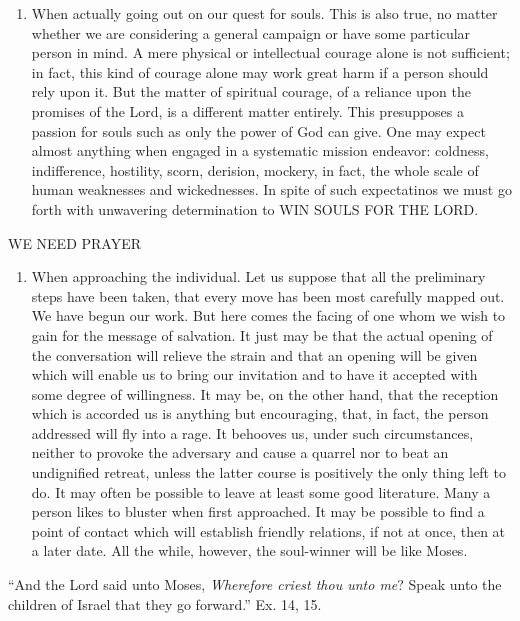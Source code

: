 \documentclass[
]{book}
\providecommand{\tightlist}{%
  \setlength{\itemsep}{0pt}\setlength{\parskip}{0pt}}
\begin{document}
\begin{enumerate}
\def\labelenumi{\alph{enumi}.}
\setcounter{enumi}{2}
\tightlist
\item
  When actually going out on our quest for souls. This is also true, no matter whether we are considering a general campaign or have some particular person in mind. A mere physical or intellectual courage alone is not sufficient; in fact, this kind of courage alone may work great harm if a person should rely upon it. But the matter of spiritual courage, of a reliance upon the promises of the Lord, is a different matter entirely. This presupposes a passion for souls such as only the power of God can give. One may expect almost anything when engaged in a systematic mission endeavor: coldness, indifference, hostility, scorn, derision, mockery, in fact, the whole scale of human weaknesses and wickednesses. In spite of such expectatinos we must go forth with unwavering determination to WIN SOULS FOR THE LORD.
\end{enumerate}

WE NEED PRAYER

\begin{enumerate}
\def\labelenumi{\alph{enumi}.}
\setcounter{enumi}{3}
\tightlist
\item
  When approaching the individual. Let us suppose that all the preliminary steps have been taken, that every move has been most carefully mapped out. We have begun our work. But here comes the facing of one whom we wish to gain for the message of salvation. It just may be that the actual opening of the conversation will relieve the strain and that an opening will be given which will enable us to bring our invitation and to have it accepted with some degree of willingness. It may be, on the other hand, that the reception which is accorded us is anything but encouraging, that, in fact, the person addressed will fly into a rage. It behooves us, under such circumstances, neither to provoke the adversary and cause a quarrel nor to beat an undignified retreat, unless the latter course is positively the only thing left to do. It may often be possible to leave at least some good literature. Many a person likes to bluster when first approached. It may be possible to find a point of contact which will establish friendly relations, if not at once, then at a later date. All the while, however, the soul-winner will be like Moses.
\end{enumerate}

``And the Lord said unto Moses, \emph{Wherefore criest thou unto me}? Speak unto the children of Israel that they go forward.'' Ex. 14, 15.
\end{document}

